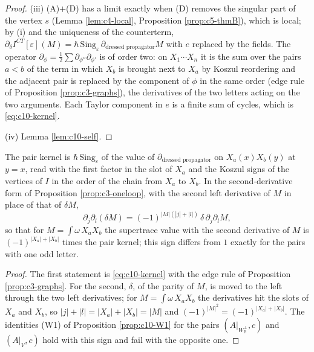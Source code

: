 \begin{proof}
(iii) (A)$+$(D) has a limit exactly when (D) removes the singular part of the vertex $s$ (Lemma \ref{lem:c4-local}, Proposition \ref{prop:c5-thmB}), which is local; by (i) and the uniqueness of the counterterm, $\partial_\delta I^{CT}[\varepsilon](M)=\hbar\,\mathrm{Sing}_\varepsilon\,\partial_{\text{dressed propagator}}M$ with $e$ replaced by the fields. The operator $\partial_\phi=\tfrac12\sum\partial_{\phi''}\partial_{\phi'}$ is of order two: on $X_1\cdots X_n$ it is the sum over the pairs $a<b$ of the term in which $X_b$ is brought next to $X_a$ by Koszul reordering and the adjacent pair is replaced by the component of $\phi$ in the same order (edge rule of Proposition \ref{prop:c3-graphs}), the derivatives of the two letters acting on the two arguments. Each Taylor component in $e$ is a finite sum of cycles, which is \eqref{eq:c10-kernel}.

(iv) Lemma \ref{lem:c10-self}.
\end{proof}

\begin{lemma}
\label{lem:c10-sign}
The pair kernel is $\hbar\,\mathrm{Sing}_\varepsilon$ of the value of $\partial_{\text{dressed propagator}}$ on $X_a(x)X_b(y)$ at $y=x$, read with the first factor in the slot of $X_a$ and the Koszul signs of the vertices of $I$ in the order of the chain from $X_a$ to $X_b$. In the second-derivative form of Proposition \ref{prop:c3-oneloop}, with the second left derivative of $M$ in place of that of $\delta M$,
\[
\partial_j\partial_l(\delta M)=(-1)^{|M|(|j|+|l|)}\,\delta\,\partial_j\partial_lM,
\]
so that for $M=\int\omega\,X_aX_b$ the supertrace value with the second derivative of $M$ is $(-1)^{|X_a|+|X_b|}$ times the pair kernel; this sign differs from $1$ exactly for the pairs with one odd letter.
\end{lemma}

\begin{proof}
The first statement is \eqref{eq:c10-kernel} with the edge rule of Proposition \ref{prop:c3-graphs}. For the second, $\delta$, of the parity of $M$, is moved to the left through the two left derivatives; for $M=\int\omega\,X_aX_b$ the derivatives hit the slots of $X_a$ and $X_b$, so $|j|+|l|=|X_a|+|X_b|=|M|$ and $(-1)^{|M|^2}=(-1)^{|X_a|+|X_b|}$. The identities (W1) of Proposition \ref{prop:c10-W1} for the pairs $(A|_{W_{\mathbb R}^\perp},c)$ and $(A|_V,c)$ hold with this sign and fail with the opposite one.
\end{proof}

